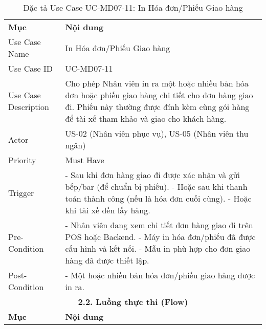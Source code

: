 \begin{longtable}{|m{4cm}|p{11cm}|}
\caption{Đặc tả Use Case UC-MD07-11: In Hóa đơn/Phiếu Giao hàng} \label{tab:uc_md07_11} \\
\hline

\endhead %
\hline
\endfoot %
\hline
\endlastfoot %
\multicolumn{2}{|c|}{\textbf{2.1. Tóm tắt (Summary)}} \\
\hline
\textbf{Mục} & \textbf{Nội dung} \\
\hline
Use Case Name & In Hóa đơn/Phiếu Giao hàng \\
\hline
Use Case ID & UC-MD07-11 \\
\hline
Use Case Description & Cho phép Nhân viên in ra một hoặc nhiều bản hóa đơn hoặc phiếu giao hàng chi tiết cho đơn hàng giao đi. Phiếu này thường được đính kèm cùng gói hàng để tài xế tham khảo và giao cho khách hàng. \\
\hline
Actor & US-02 (Nhân viên phục vụ), US-05 (Nhân viên thu ngân) \\
\hline
Priority & Must Have \\
\hline
Trigger & - Sau khi đơn hàng giao đi được xác nhận và gửi bếp/bar (để chuẩn bị phiếu). \newline - Hoặc sau khi thanh toán thành công (nếu là hóa đơn cuối cùng). \newline - Hoặc khi tài xế đến lấy hàng. \\
\hline
Pre-Condition & - Nhân viên đang xem chi tiết đơn hàng giao đi trên POS hoặc Backend. \newline - Máy in hóa đơn/phiếu đã được cấu hình và kết nối. \newline - Mẫu in phù hợp cho đơn giao hàng đã được thiết lập. \\
\hline
Post-Condition & - Một hoặc nhiều bản hóa đơn/phiếu giao hàng được in ra. \\
\hline
\multicolumn{2}{|c|}{\textbf{2.2. Luồng thực thi (Flow)}} \\
\hline
\textbf{Mục} & \textbf{Nội dung} \\
\hline

\end{longtable}

